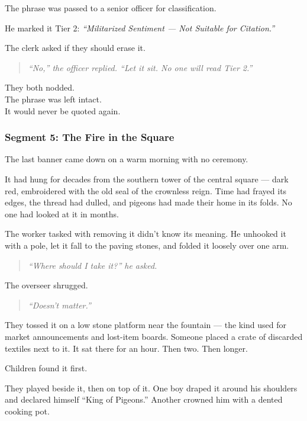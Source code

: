 \documentclass[9pt]{article}
\begin{document}
The phrase was passed to a senior officer for classification.

He marked it Tier 2: \textit{“Militarized Sentiment --- Not Suitable for Citation.”}

The clerk asked if they should erase it.

\begin{quote}
\textit{“No,” the officer replied. “Let it sit. No one will read Tier 2.”}
\end{quote}

They both nodded.\\
The phrase was left intact.\\
It would never be quoted again.

\newpage

\subsubsection*{Segment 5: The Fire in the Square}

The last banner came down on a warm morning with no ceremony.

It had hung for decades from the southern tower of the central square --- dark red, embroidered with the old seal of the crownless reign. Time had frayed its edges, the thread had dulled, and pigeons had made their home in its folds. No one had looked at it in months.

The worker tasked with removing it didn't know its meaning. He unhooked it with a pole, let it fall to the paving stones, and folded it loosely over one arm.

\begin{quote}
\textit{“Where should I take it?” he asked.}
\end{quote}

The overseer shrugged.

\begin{quote}
\textit{“Doesn’t matter.”}
\end{quote}

They tossed it on a low stone platform near the fountain --- the kind used for market announcements and lost-item boards. Someone placed a crate of discarded textiles next to it. It sat there for an hour. Then two. Then longer.

Children found it first.

They played beside it, then on top of it. One boy draped it around his shoulders and declared himself “King of Pigeons.” Another crowned him with a dented cooking pot.
\end{document}
